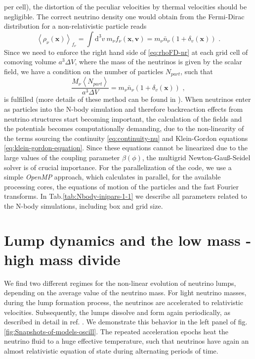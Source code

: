 per cell), the distortion of the peculiar velocities by thermal velocities
should be negligible. The correct neutrino density one would obtain
from the Fermi-Dirac distribution for a non-relativistic particle
reads 
\begin{equation}
\left\langle \rho_{\nu}(\mathbf{x})\right\rangle _{f_{\nu}}=\int\mbox{d}^{3}v\: m_{\nu}f_{\nu}(\mathbf{x},\mathbf{v})=m_{\nu}\bar{n}_{\nu}(1+\delta_{v}(\mathbf{x}))\,\,.\label{eq:rhoFD-nr}
\end{equation}
Since we need to enforce the right hand side of \ref{eq:rhoFD-nr}
at each grid cell of comoving volume $a^{3}\Delta V$, where the mass
of the neutrinos is given by the scalar field, we have a condition
on the number of particles $N_{part}$, such that 
\begin{equation}
\frac{M_{\nu}\left\langle N_{part}\right\rangle }{a^{3}\Delta V}=m_{\nu}\bar{n}_{\nu}(1+\delta_{v}(\mathbf{x}))\,\,,
\end{equation}
is fulfilled (more details of these method can be found in \cite{ayaita_structure_2012}).
When neutrinos enter as particles into the N-body simulation and therefore
backreaction effects from neutrino structures start becoming important,
the calculation of the fields and the potentials becomes computationally
demanding, due to the non-linearity of the terms sourcing the continuity
\ref{eq:continuity-nu} and Klein-Gordon equations \ref{eq:klein-gordon-equation}.
Since these equations cannot be linearized due to the large values
of the coupling parameter $\beta(\phi)$, the multigrid Newton-Gauß-Seidel
solver is of crucial importance. For the parallelization of the code,
we use a simple \emph{OpenMP} approach, which calculates in parallel,
for the available processing cores, the equations of motion of the
particles and the fast Fourier transforms. In Tab.\ref{tab:Nbody-inipars-1-1}
we describe all parameters related to the N-body simulations, including
box and grid size.


\section{Lump dynamics and the low mass - high mass divide}

We find two different regimes for the non-linear evolution of neutrino
lumps, depending on the average value of the neutrino mass. For light
neutrino masses, during the lump formation process, the neutrinos
are accelerated to relativistic velocities. Subsequently, the lumps
dissolve and form again periodically, as described in detail in ref.
\cite{ayaita_nonlinear_2016,baldi_oscillating_2011}. We demonstrate
this behavior in the left panel of fig. \ref{fig:Snapshots-of-models-oscill}.
The repeated acceleration epochs heat the neutrino fluid to a huge
effective temperature, such that neutrinos have again an almost relativistic
equation of state during alternating periods of time.

